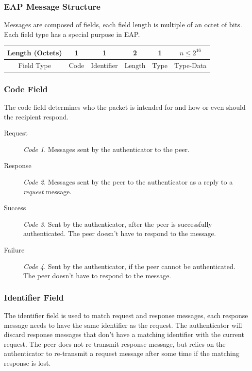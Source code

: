 \subsubsection{EAP Message Structure}
Messages are composed of fields, each field length is multiple of an octet of bits.
Each field type has a special purpose in EAP.

\begin{center}
	\begin{tabular}{|c|c|c|c|c|c|}
		\hline
		Length (Octets) & 1 & 1 & 2 & 1 & $n \le 2^{16}$\\
		\hline
		Field Type & Code & Identifier & Length & Type & Type-Data\\
		\hline
	\end{tabular}
\end{center}


\subsubsection{Code Field}
The code field determines who the packet is intended for and how or even should the recipient respond.

\begin{description}
	\item[Request]\textit{Code 1}. Messages sent by the authenticator to the peer.
	\item[Response]\textit{Code 2}. Messages sent by the peer to the authenticator as a reply to a \textit{request} message.
	\item[Success]\textit{Code 3}. Sent by the authenticator, after the peer is successfully authenticated. The peer doesn't have to respond to the message.
	\item[Failure]\textit{Code 4}. Sent by the authenticator, if the peer cannot be authenticated. The peer doesn't have to respond to the message.
\end{description}

\subsubsection{Identifier Field}
The identifier field is used to match request and response messages, each response message needs to have the same identifier as the request.
The authenticator will discard response messages that don't have a matching identifier with the current request.
The peer does not re-transmit response message, but relies on the authenticator to re-transmit a request message after some time if the matching response is lost.

